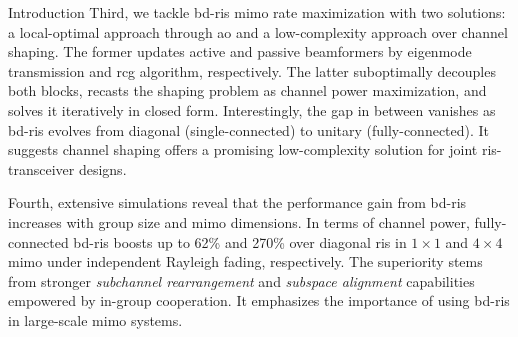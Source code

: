 \documentclass[journal]{IEEEtran}
\begin{document}
\begin{section}{Introduction}
	Third, we tackle \gls{bd}-\gls{ris} \gls{mimo} rate maximization with two solutions: a local-optimal approach through \gls{ao} and a low-complexity approach over channel shaping.
	The former updates active and passive beamformers by eigenmode transmission and \gls{rcg} algorithm, respectively.
	The latter suboptimally decouples both blocks, recasts the shaping problem as channel power maximization, and solves it iteratively in closed form.
	Interestingly, the gap in between vanishes as \gls{bd}-\gls{ris} evolves from diagonal (single-connected) to unitary (fully-connected).
	It suggests channel shaping offers a promising low-complexity solution for joint \gls{ris}-transceiver designs.


	Fourth, extensive simulations reveal that the performance gain from \gls{bd}-\gls{ris} increases with group size and \gls{mimo} dimensions.
	In terms of channel power, fully-connected \gls{bd}-\gls{ris} boosts up to 62\% and 270\% over diagonal \gls{ris} in $1 \times 1$ and $4 \times 4$ \gls{mimo} under independent Rayleigh fading, respectively.
	The superiority stems from stronger \emph{subchannel rearrangement} and \emph{subspace alignment} capabilities empowered by in-group cooperation.
	It emphasizes the importance of using \gls{bd}-\gls{ris} in large-scale \gls{mimo} systems.



\end{section}
\end{document}
